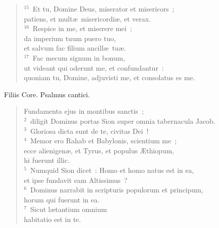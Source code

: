 \begin{flushleft}
\begin{verse}
${}^{15}$~Et tu, Domine Deus, miserator et misericors~;\\ patiens, et mult\ae\ misericordi\ae , et verax.\\
${}^{16}$~Respice in me, et miserere mei~;\\ da imperium tuum puero tuo,\\ et salvum fac filium ancill\ae\ tu\ae .\\
${}^{17}$~Fac mecum signum in bonum,\\ ut videant qui oderunt me, et confundantur~:\\ quoniam tu, Domine, adjuvisti me, et consolatus es me.\end{verse}\end{flushleft}



\bchapter
\lettrine[lines=3,image=true,loversize=0.05,lraise=-0.03]{F}{}iliis Core. Psalmus cantici. \begin{flushleft}\begin{verse}\vspace{6pt}Fundamenta ejus in montibus sanctis~;\\
${}^{2}$~diligit Dominus portas Sion super omnia tabernacula Jacob.\\
${}^{3}$~Gloriosa dicta sunt de te, civitas Dei~!\\
${}^{4}$~Memor ero Rahab et Babylonis, scientium me~;\\ ecce alienigen\ae , et Tyrus, et populus \AE thiopum,\\ hi fuerunt illic.\\
${}^{5}$~Numquid Sion dicet~: Homo et homo natus est in ea,\\ et ipse fundavit eam Altissimus~?\\
${}^{6}$~Dominus narrabit in scripturis populorum et principum,\\ horum qui fuerunt in ea.\\
${}^{7}$~Sicut l\ae tantium omnium\\ habitatio est in te.\end{verse}\end{flushleft}



